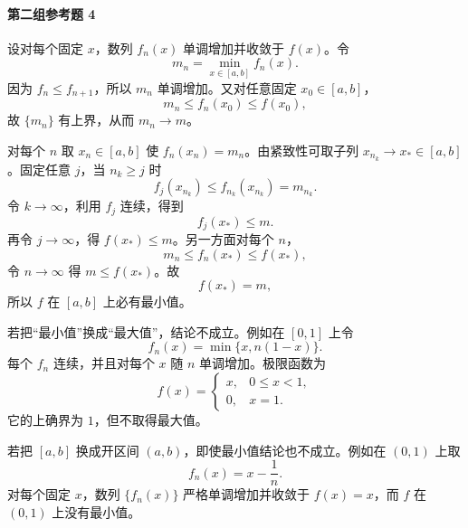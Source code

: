 \paragraph{第二组参考题 4}
\begin{xsolution}
设对每个固定 $x$，数列 $f_n(x)$ 单调增加并收敛于 $f(x)$。令
\[
  m_n=\min_{x\in[a,b]}f_n(x).
\]
因为 $f_n\leqslant f_{n+1}$，所以 $m_n$ 单调增加。又对任意固定 $x_0\in[a,b]$，
\[
  m_n\leqslant f_n(x_0)\leqslant f(x_0),
\]
故 $\{m_n\}$ 有上界，从而 $m_n\to m$。

对每个 $n$ 取 $x_n\in[a,b]$ 使 $f_n(x_n)=m_n$。由紧致性可取子列 $x_{n_k}\to x_*\in[a,b]$。固定任意 $j$，当 $n_k\geqslant j$ 时
\[
  f_j(x_{n_k})\leqslant f_{n_k}(x_{n_k})=m_{n_k}.
\]
令 $k\to\infty$，利用 $f_j$ 连续，得到
\[
  f_j(x_*)\leqslant m.
\]
再令 $j\to\infty$，得 $f(x_*)\leqslant m$。另一方面对每个 $n$，
\[
  m_n\leqslant f_n(x_*)\leqslant f(x_*),
\]
令 $n\to\infty$ 得 $m\leqslant f(x_*)$。故
\[
  f(x_*)=m,
\]
所以 $f$ 在 $[a,b]$ 上必有最小值。

若把“最小值”换成“最大值”，结论不成立。例如在 $[0,1]$ 上令
\[
  f_n(x)=\min\{x,n(1-x)\}.
\]
每个 $f_n$ 连续，并且对每个 $x$ 随 $n$ 单调增加。极限函数为
\[
  f(x)=
  \begin{cases}
    x,&0\leqslant x<1,\\
    0,&x=1.
  \end{cases}
\]
它的上确界为 $1$，但不取得最大值。

若把 $[a,b]$ 换成开区间 $(a,b)$，即使最小值结论也不成立。例如在 $(0,1)$ 上取
\[
  f_n(x)=x-\frac1n.
\]
对每个固定 $x$，数列 $\{f_n(x)\}$ 严格单调增加并收敛于 $f(x)=x$，而 $f$ 在 $(0,1)$ 上没有最小值。
\end{xsolution}

